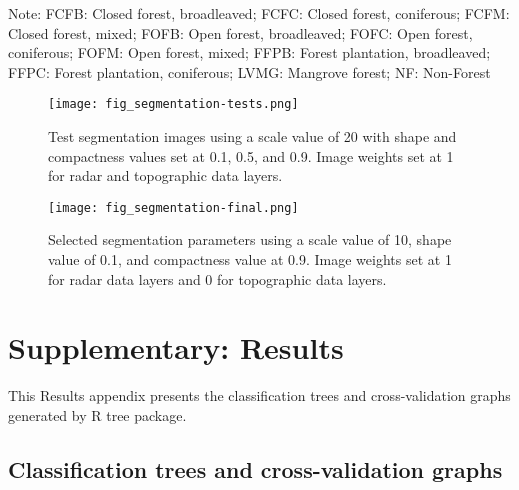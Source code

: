\begin{appendices}
\begin{landscape}
\begin{spacing}{1.0}
	\noindent Note: FCFB: Closed forest, broadleaved; FCFC: Closed forest, coniferous; FCFM: Closed forest, mixed; FOFB: Open forest, broadleaved;  FOFC: Open forest, coniferous; FOFM: Open forest, mixed; FFPB: Forest plantation, broadleaved; FFPC: Forest plantation, coniferous; LVMG: Mangrove forest; NF: Non-Forest\\ \newline
	
\end{spacing}
\end{landscape}


\begin{figure}
	\centering
	\texttt{[image: fig\_segmentation-tests.png]}
	\caption[Images of segmentation tests.]{Test segmentation images using a scale value of 20 with shape and compactness values set at 0.1, 0.5, and 0.9. Image weights set at 1 for radar and topographic data layers.}
	\label{fig: appendix-fig.b1}
\end{figure}

\begin{figure}
	\centering
	\texttt{[image: fig\_segmentation-final.png]}
	\caption[Images of selected segmentation parameters.]{Selected segmentation parameters using a scale value of 10, shape value of 0.1, and compactness value at 0.9. Image weights set at 1 for radar data layers and 0 for topographic data layers.}
	\label{fig: appendix-fig.b2}
\end{figure}

\chapter{Supplementary: Results}
\label{sup: supplementary-results}

This Results appendix presents the classification trees and cross-validation graphs generated by R tree package.

\section{Classification trees and cross-validation graphs}
\label{app: appendix-trees-graphs}



\end{appendices}
